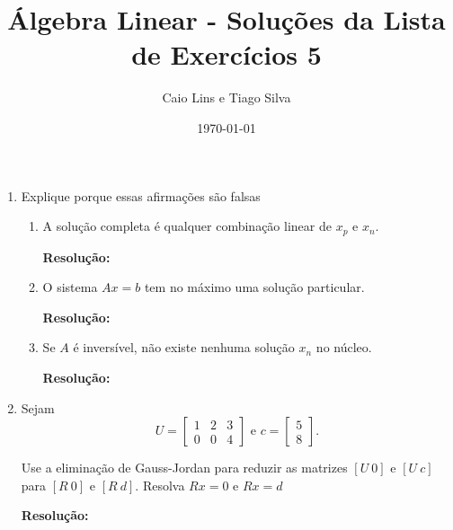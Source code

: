 \documentclass[leqno]{article}
\title{Álgebra Linear - Soluções da Lista de Exercícios 5}
\author{Caio Lins e Tiago Silva}
\date{\today}
\numberwithin{equation}{section}
\newenvironment{sol}
{
    \vspace{4mm}
    \noindent\textbf{Resolução:}
    \strut\newline
    \smallskip
    \hspace{-3.5mm}
}
{}
\begin{document}
\maketitle

\begin{enumerate}

    \item Explique porque essas afirmações são falsas

        \begin{enumerate}

            \item A solução completa é qualquer combinação linear de $x_p$ e $x_n$.

                \begin{sol} 
                \end{sol} 

            \item O sistema $Ax = b$ tem no máximo uma solução particular.

                \begin{sol} 
                \end{sol} 

            \item Se $A$ é inversível, não existe nenhuma solução $x_n$ no núcleo.

                \begin{sol} 
                \end{sol} 

        \end{enumerate}

    \item Sejam
        $$U = \begin{bmatrix} 
            1 & 2 & 3 \\
            0 & 0 & 4
            \end{bmatrix} \mbox{ e } c = \begin{bmatrix} 
            5 \\
            8
        \end{bmatrix}.$$

        Use a eliminação de Gauss-Jordan para reduzir as matrizes $[U \ 0]$ e $[U \ c]$ para $[R \ 0]$ e $[R \ d]$. Resolva $Rx = 0$ e $Rx = d$

        \begin{sol} 
        \end{sol} 


\end{enumerate}
\end{document}
